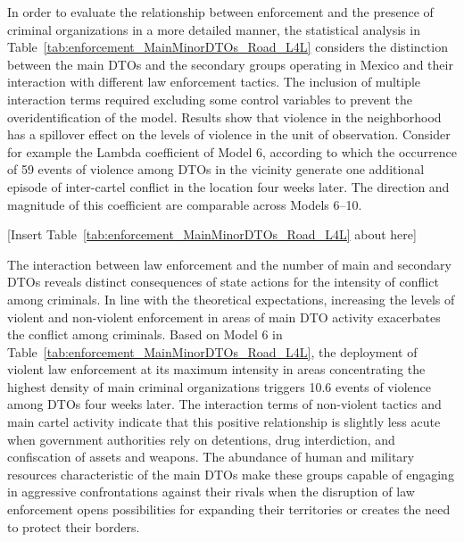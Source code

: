 \documentclass[12pt,letterpaper]{article}
\begin{document}

In order to evaluate the relationship between enforcement and the presence of criminal organizations in a more detailed manner, the statistical analysis in Table~\ref{tab:enforcement_MainMinorDTOs_Road_L4L} considers the distinction between the main DTOs and the secondary groups operating in Mexico and their interaction with different law enforcement tactics. The inclusion of multiple interaction terms required excluding some control variables to prevent the overidentification of the model. Results show that violence in the neighborhood  has a spillover effect on the levels of violence in the unit of observation. Consider for example the Lambda coefficient of Model 6, according to which the occurrence of 59 events of violence among DTOs in the vicinity generate one additional episode of inter-cartel conflict in the location four weeks later. The direction and magnitude of this coefficient are comparable across Models 6--10.


\begin{center}
   [Insert Table~\ref{tab:enforcement_MainMinorDTOs_Road_L4L} about here]
\end{center}


The interaction between law enforcement and the number of main and secondary DTOs reveals distinct consequences of state actions for the intensity of conflict among criminals. In line with the theoretical expectations, increasing the levels of violent and non-violent enforcement in areas of main DTO activity exacerbates the conflict among criminals. Based on Model 6  in Table~\ref{tab:enforcement_MainMinorDTOs_Road_L4L}, the deployment of violent law enforcement at its maximum intensity in areas concentrating the highest density of main criminal organizations triggers 10.6 events of violence among DTOs four weeks later. The interaction terms of non-violent tactics and main cartel activity indicate that this positive relationship is slightly less acute when government authorities rely on detentions, drug interdiction, and confiscation of assets and weapons. The abundance of human and military resources characteristic of the main DTOs make these groups capable of engaging in aggressive confrontations against their rivals when the disruption of law enforcement opens possibilities for expanding their territories or creates the need to protect their borders.
\end{document}
